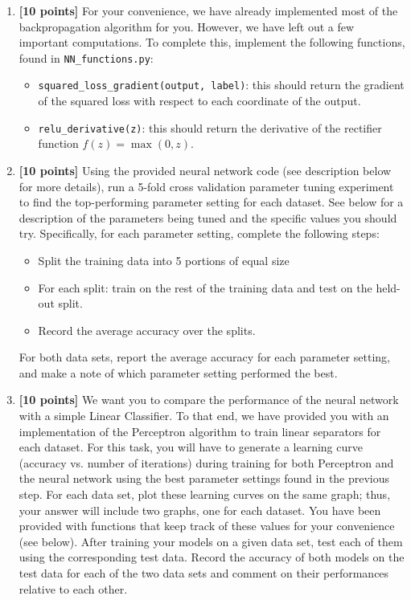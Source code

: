 \begin{enumerate}
\begin{enumerate}
  	\begin{enumerate}
  	\item {\bf [10 points]} For your convenience, we have already implemented most of the backpropagation algorithm for you. However, we have left out a few important computations. To complete this, implement the following functions, found in {\tt NN\_functions.py}:
  		\begin{itemize}
  			\item {\tt squared\_loss\_gradient(output, label)}: this should return the gradient of the squared loss with respect to each coordinate of the output.
  			\item {\tt relu\_derivative(z)}: this should return the derivative of the rectifier function $f(z) = \max(0, z)$.
  		\end{itemize}
	\item {\bf [10 points]} Using the provided neural network code (see description below for more details), run a 5-fold cross validation  parameter tuning experiment to find the top-performing parameter setting for each dataset. See below for a description of the parameters being tuned and the specific values you should try. Specifically, for each parameter setting, complete the following steps:
		\begin{itemize}
			\item Split the training data into 5 portions of equal size
			\item For each split: train on the rest of the training data and test on the held-out split.
			\item Record the average accuracy over the splits.
		\end{itemize}	
	For both data sets, report the average accuracy for each parameter setting, and make a note of which  parameter setting performed the best.
	\item {\bf [10 points]} We want you to compare the performance of the neural network with a simple Linear Classifier. To that end, we have provided you with an implementation of the Perceptron algorithm to train linear separators for each dataset. For this task, you will have to generate a learning curve (accuracy vs. number of iterations) during training for both Perceptron and the neural network using the best parameter settings found in the previous step. For each data set, plot these learning curves on the same graph; thus, your answer will include two graphs, one for each dataset. You have been provided with functions that keep track of these values for your convenience (see below). After training your models on a given data set, test each of them using the corresponding test data. Record the accuracy of both models on the test data for each of the two data sets and comment on their performances relative to each other.
	\end{enumerate}
  

\end{enumerate}
\end{enumerate}

